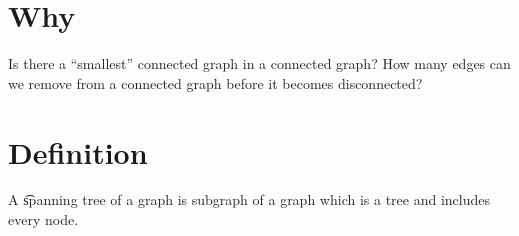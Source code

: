 
\section*{Why}

Is there a ``smallest'' connected graph in a connected graph?
How many edges can we remove from a connected graph before it becomes disconnected?

\section*{Definition}

A \t{spanning tree of a graph} is subgraph of a graph which is a tree and includes every node.

